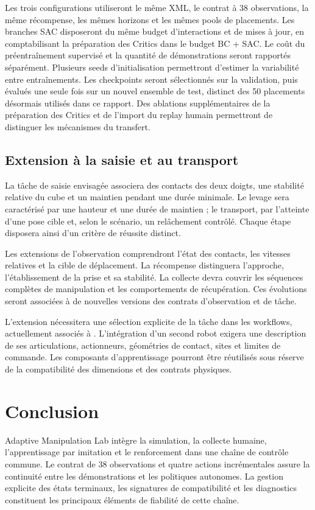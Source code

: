 \documentclass[conference,a4paper]{IEEEtran}
\newcommand{\code}[1]{\texttt{\detokenize{#1}}}
\begin{document}
Les trois configurations utiliseront le même XML, le contrat à 38 observations, la même récompense, les mêmes horizons et les mêmes pools de placements. Les branches SAC disposeront du même budget d'interactions et de mises à jour, en comptabilisant la préparation des Critics dans le budget BC + SAC. Le coût du préentraînement supervisé et la quantité de démonstrations seront rapportés séparément. Plusieurs seeds d'initialisation permettront d'estimer la variabilité entre entraînements. Les checkpoints seront sélectionnés sur la validation, puis évalués une seule fois sur un nouvel ensemble de test, distinct des 50 placements désormais utilisés dans ce rapport. Des ablations supplémentaires de la préparation des Critics et de l'import du replay humain permettront de distinguer les mécanismes du transfert.

\subsection{Extension à la saisie et au transport}
La tâche de saisie envisagée associera des contacts des deux doigts, une stabilité relative du cube et un maintien pendant une durée minimale. Le levage sera caractérisé par une hauteur et une durée de maintien ; le transport, par l'atteinte d'une pose cible et, selon le scénario, un relâchement contrôlé. Chaque étape disposera ainsi d'un critère de réussite distinct.

Les extensions de l'observation comprendront l'état des contacts, les vitesses relatives et la cible de déplacement. La récompense distinguera l'approche, l'établissement de la prise et sa stabilité. La collecte devra couvrir les séquences complètes de manipulation et les comportements de récupération. Ces évolutions seront associées à de nouvelles versions des contrats d'observation et de tâche.

L'extension nécessitera une sélection explicite de la tâche dans les workflows, actuellement associés à \code{reach}. L'intégration d'un second robot exigera une description de ses articulations, actionneurs, géométries de contact, sites et limites de commande. Les composants d'apprentissage pourront être réutilisés sous réserve de la compatibilité des dimensions et des contrats physiques.

\section{Conclusion}
Adaptive Manipulation Lab intègre la simulation, la collecte humaine, l'apprentissage par imitation et le renforcement dans une chaîne de contrôle commune. Le contrat de 38 observations et quatre actions incrémentales assure la continuité entre les démonstrations et les politiques autonomes. La gestion explicite des états terminaux, les signatures de compatibilité et les diagnostics constituent les principaux éléments de fiabilité de cette chaîne.
\end{document}
